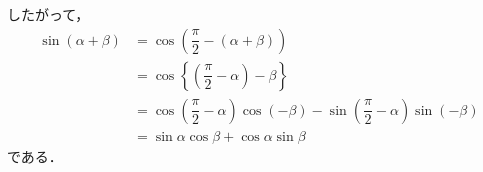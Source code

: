 \documentclass[../../main.tex]{subfiles}
\begin{document}
したがって，
\begin{align}
  \sin(\alpha+\beta) &= \cos\left( \dfrac{\pi}{2} - (\alpha+\beta) \right) \\
  &= \cos\left\{ \left(\dfrac{\pi}{2} - \alpha\right) - \beta \right\} \\
  &= \cos\left(\dfrac{\pi}{2} - \alpha\right) \cos(-\beta) - \sin\left(\dfrac{\pi}{2} - \alpha\right) \sin(-\beta) \\
  &= \sin\alpha \cos\beta + \cos\alpha \sin\beta
\end{align}
である．

\newpage
\end{document}
